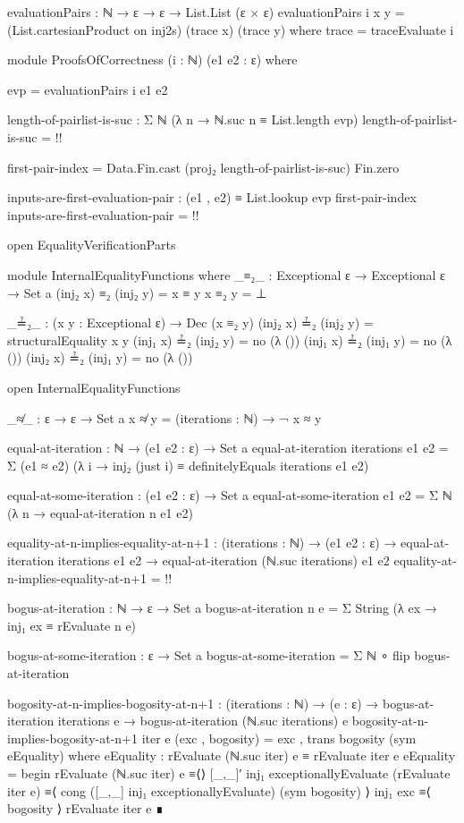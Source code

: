 \documentclass{report}
\begin{document}
\begin{code}
    evaluationPairs : ℕ → ε → ε → List.List (ε × ε)
    evaluationPairs i x y = (List.cartesianProduct on inj2s) (trace x) (trace y)
      where
      trace = traceEvaluate i

    module ProofsOfCorrectness
      (i : ℕ)
      (e1 e2 : ε) where

      evp = evaluationPairs i e1 e2

      length-of-pairlist-is-suc : Σ ℕ (λ n → ℕ.suc n ≡ List.length evp)
      length-of-pairlist-is-suc = {!!}

      first-pair-index = Data.Fin.cast (proj₂ length-of-pairlist-is-suc) Fin.zero

      inputs-are-first-evaluation-pair :
        (e1 , e2) ≡ List.lookup evp first-pair-index
      inputs-are-first-evaluation-pair = {!!}

  open EqualityVerificationParts

  module InternalEqualityFunctions where
    _≡₂_ : Exceptional ε → Exceptional ε → Set a
    (inj₂ x) ≡₂ (inj₂ y) = x ≡ y
    x ≡₂ y = ⊥

    _≟₂_ : (x y : Exceptional ε) → Dec (x ≡₂ y)
    (inj₂ x) ≟₂ (inj₂ y) = structuralEquality x y
    (inj₁ x) ≟₂ (inj₂ y) = no (λ ())
    (inj₁ x) ≟₂ (inj₁ y) = no (λ ())
    (inj₂ x) ≟₂ (inj₁ y) = no (λ ())

  open InternalEqualityFunctions

  _≉_ : ε → ε → Set a
  x ≉ y = (iterations : ℕ) → ¬ x ≈ y

  equal-at-iteration : ℕ → (e1 e2 : ε) → Set a
  equal-at-iteration iterations e1 e2 =
    Σ (e1 ≈ e2)
      (λ i → inj₂ (just i) ≡ definitelyEquals iterations e1 e2)

  equal-at-some-iteration : (e1 e2 : ε) → Set a
  equal-at-some-iteration e1 e2 = Σ ℕ (λ n → equal-at-iteration n e1 e2)

  equality-at-n-implies-equality-at-n+1 :
    (iterations : ℕ) →
    (e1 e2 : ε) →
    equal-at-iteration iterations e1 e2 →
    equal-at-iteration (ℕ.suc iterations) e1 e2
  equality-at-n-implies-equality-at-n+1 = {!!}

  bogus-at-iteration : ℕ → ε → Set a
  bogus-at-iteration n e = Σ String (λ ex → inj₁ ex ≡ rEvaluate n e)

  bogus-at-some-iteration : ε → Set a
  bogus-at-some-iteration = Σ ℕ ∘ flip bogus-at-iteration

  bogosity-at-n-implies-bogosity-at-n+1 :
    (iterations : ℕ) →
    (e : ε) →
    bogus-at-iteration iterations e →
    bogus-at-iteration (ℕ.suc iterations) e
  bogosity-at-n-implies-bogosity-at-n+1 iter e (exc , bogosity) =
    exc , trans bogosity (sym eEquality)
    where
    eEquality : rEvaluate (ℕ.suc iter) e ≡ rEvaluate iter e
    eEquality = begin
      rEvaluate (ℕ.suc iter) e
        ≡⟨⟩
      [_,_]′ inj₁ exceptionallyEvaluate (rEvaluate iter e)
        ≡⟨ cong ([_,_] inj₁ exceptionallyEvaluate) (sym bogosity) ⟩
      inj₁ exc
        ≡⟨ bogosity ⟩
      rEvaluate iter e ∎


\end{code}
\end{document}
